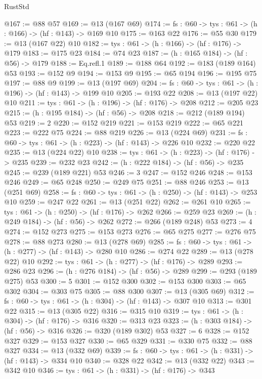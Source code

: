 \begin{lexlean}{RustStd}
\begin{coremodule}
@167 := @88 @57
@169 := @13 (@167 @69)
@174 := {fs : @60} -> {tys : @61} -> (h : @166) -> (hf : @143) -> @169 @10
@175 := @163 @22
@176 := @55 @30
@179 := @13 (@167 @22) @10
@182 := {tys : @61} -> (h : @166) -> (hf : @176) -> @179
@183 := @175 @23
@184 := @74 @23
@187 := (h : @165 @184) -> (hf : @56) -> @179
@188 := Eq.refl.{1}
@189 := @188 @64
@192 := @183 (@189 @164) @53
@193 := @152 @9
@194 := @153 @9
@195 := @65 @194
@196 := @195 @75
@197 := @88 @9
@199 := @13 (@197 @69)
@204 := {fs : @60} -> {tys : @61} -> (h : @196) -> (hf : @143) -> @199 @10
@205 := @193 @22
@208 := @13 (@197 @22) @10
@211 := {tys : @61} -> (h : @196) -> (hf : @176) -> @208
@212 := @205 @23
@215 := (h : @195 @184) -> (hf : @56) -> @208
@218 := @212 (@189 @194) @53
@219 := 2
@220 := @152 @219
@221 := @153 @219
@222 := @65 @221
@223 := @222 @75
@224 := @88 @219
@226 := @13 (@224 @69)
@231 := {fs : @60} -> {tys : @61} -> (h : @223) -> (hf : @143) -> @226 @10
@232 := @220 @22
@235 := @13 (@224 @22) @10
@238 := {tys : @61} -> (h : @223) -> (hf : @176) -> @235
@239 := @232 @23
@242 := (h : @222 @184) -> (hf : @56) -> @235
@245 := @239 (@189 @221) @53
@246 := 3
@247 := @152 @246
@248 := @153 @246
@249 := @65 @248
@250 := @249 @75
@251 := @88 @246
@253 := @13 (@251 @69)
@258 := {fs : @60} -> {tys : @61} -> (h : @250) -> (hf : @143) -> @253 @10
@259 := @247 @22
@261 := @13 (@251 @22)
@262 := @261 @10
@265 := {tys : @61} -> (h : @250) -> (hf : @176) -> @262
@266 := @259 @23
@269 := (h : @249 @184) -> (hf : @56) -> @262
@272 := @266 (@189 @248) @53
@273 := 4
@274 := @152 @273
@275 := @153 @273
@276 := @65 @275
@277 := @276 @75
@278 := @88 @273
@280 := @13 (@278 @69)
@285 := {fs : @60} -> {tys : @61} -> (h : @277) -> (hf : @143) -> @280 @10
@286 := @274 @22
@289 := @13 (@278 @22) @10
@292 := {tys : @61} -> (h : @277) -> (hf : @176) -> @289
@293 := @286 @23
@296 := (h : @276 @184) -> (hf : @56) -> @289
@299 := @293 (@189 @275) @53
@300 := 5
@301 := @152 @300
@302 := @153 @300
@303 := @65 @302
@304 := @303 @75
@305 := @88 @300
@307 := @13 (@305 @69)
@312 := {fs : @60} -> {tys : @61} -> (h : @304) -> (hf : @143) -> @307 @10
@313 := @301 @22
@315 := @13 (@305 @22)
@316 := @315 @10
@319 := {tys : @61} -> (h : @304) -> (hf : @176) -> @316
@320 := @313 @23
@323 := (h : @303 @184) -> (hf : @56) -> @316
@326 := @320 (@189 @302) @53
@327 := 6
@328 := @152 @327
@329 := @153 @327
@330 := @65 @329
@331 := @330 @75
@332 := @88 @327
@334 := @13 (@332 @69)
@339 := {fs : @60} -> {tys : @61} -> (h : @331) -> (hf : @143) -> @334 @10
@340 := @328 @22
@342 := @13 (@332 @22)
@343 := @342 @10
@346 := {tys : @61} -> (h : @331) -> (hf : @176) -> @343

\end{coremodule}
\end{lexlean}
